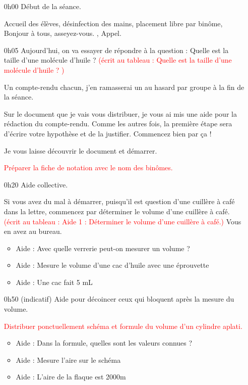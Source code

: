 \documentclass[12pt,a4paper]{article}
\begin{document}
\begin{itemize}
\item[0h00]
Début de la séance.

Accueil des élèves, désinfection des mains, placement libre par binôme, \og Bonjour à tous, asseyez-vous. \fg{}, Appel.

\item[0h05]
\og Aujourd'hui, on va essayer de répondre à la question : Quelle est la taille d'une molécule d'huile ? 
\textcolor{red}{(écrit au tableau : Quelle est la taille d'une molécule d'huile ? )}

\og Un compte-rendu chacun,  j'en ramasserai un au hasard par groupe à la fin de la séance. \fg{}

\og Sur le document que je vais vous distribuer, je vous ai mis une aide pour la rédaction du compte-rendu.
Comme les autres fois, la première étape sera d'écrire votre hypothèse et de la justifier.
Commencez bien par ça ! \fg{} 

\og Je vous laisse découvrir le document et démarrer. \fg{}

\textcolor{red}{Préparer la fiche de notation avec le nom des binômes.}

\item[0h20]
Aide collective.

\og Si vous avez du mal à démarrer, puisqu'il est question d'une cuillère à café dans la lettre, commencez par déterminer le volume d'une cuillère à café.
\textcolor{red}{(écrit au tableau : Aide 1 : Déterminer le volume d'une cuillère à café.)}
Vous en avez au bureau. \fg{}
\begin{itemize}
\item Aide : Avec quelle verrerie peut-on mesurer un volume ?

\item Aide : Mesure le volume d'une cac d'huile avec une éprouvette

\item Aide : Une cac fait 5 mL
\end{itemize}

\item[0h50] (indicatif)
Aide pour décoincer ceux qui bloquent après la mesure du volume.

\textcolor{red}{Distribuer ponctuellement schéma et formule du volume d'un cylindre aplati.}

\begin{itemize}
\item Aide : Dans la formule, quelles sont les valeurs connues ?
\item Aide : Mesure l'aire sur le schéma
\item Aide : L'aire de la flaque est \unit{2000}{m\squared}
\end{itemize}


\end{itemize}
\end{document}
